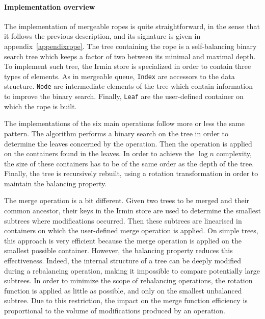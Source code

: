 \documentclass{article}
\newcommand{\irmin}{Irmin\xspace}
\newcommand{\code}[1]{\texttt{#1}}
\begin{document}

\paragraph{Implementation overview}
The implementation of mergeable ropes is quite straightforward, in the sense that it follows the previous description, and its signature is given in appendix~\ref{appendixrope}.
The tree containing the rope is a self-balancing binary search tree which keeps a factor of two between its minimal and maximal depth.
To implement such tree, the \irmin store is specialized in order to contain three types of elements.
As in mergeable queue, \code{Index} are accessors to the data structure.
\code{Node} are intermediate elements of the tree which contain information to improve the binary search.
Finally, \code{Leaf} are the user-defined container on which the rope is built.

The implementations of the six main operations follow more or less the same pattern.
The algorithm performs a binary search on the tree in order to determine the leaves concerned by the operation.
Then the operation is applied on the containers found in the leaves.
In order to achieve the $\log n$ complexity, the size of these containers has to be of the same order as the depth of the tree.
Finally, the tree is recursively rebuilt, using a rotation transformation in order to maintain the balancing property.

The merge operation is a bit different.
Given two trees to be merged and their common ancestor, their keys in the \irmin store are used to determine the smallest subtrees where modifications occurred.
Then these subtrees are linearised in containers on which the user-defined merge operation is applied.
On simple trees, this approach is very efficient because the merge operation is applied on the smallest possible container.
However, the balancing property reduces this effectiveness.
Indeed, the internal structure of a tree can be deeply modified during a rebalancing operation, making it impossible to compare potentially large subtrees.
In order to minimize the scope of rebalancing operations, the rotation function is applied as little as possible, and only on the smallest unbalanced subtree.
Due to this restriction, the impact on the merge function efficiency is proportional to the volume of modifications produced by  an operation.
\end{document}
